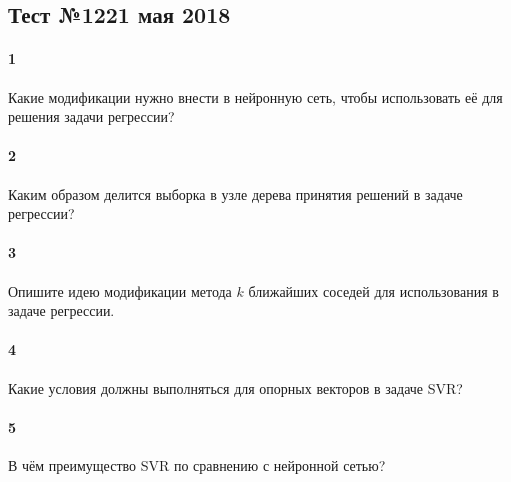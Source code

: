 \documentclass[a4paper,12pt]{article}
\begin{document}
  \subsection*{Тест №12\hfill{21 мая 2018}}

  
  \paragraph{1} Какие модификации нужно внести в нейронную сеть, чтобы использовать её для решения задачи регрессии?

  \makebox[\linewidth]{\hrulefill}
  \makebox[\linewidth]{\hrulefill}

  \paragraph{2} Каким образом делится выборка в узле дерева принятия решений в задаче регрессии?
	
  \makebox[\linewidth]{\hrulefill}
  \makebox[\linewidth]{\hrulefill}
  \makebox[\linewidth]{\hrulefill}
	
  \paragraph{3} Опишите идею модификации метода $k$ ближайших соседей для использования в задаче регрессии.

  \makebox[\linewidth]{\hrulefill}
  \makebox[\linewidth]{\hrulefill}
  \makebox[\linewidth]{\hrulefill}
  \makebox[\linewidth]{\hrulefill}

  \paragraph{4} Какие условия должны выполняться для опорных векторов в задаче SVR?

  \makebox[\linewidth]{\hrulefill}
  \makebox[\linewidth]{\hrulefill}
  \makebox[\linewidth]{\hrulefill}
  \makebox[\linewidth]{\hrulefill}

  \paragraph{5} В чём преимущество SVR по сравнению с нейронной сетью?

  \makebox[\linewidth]{\hrulefill}
  \makebox[\linewidth]{\hrulefill}
  \makebox[\linewidth]{\hrulefill}
  \makebox[\linewidth]{\hrulefill}
  \makebox[\linewidth]{\hrulefill}
 
\end{document}
